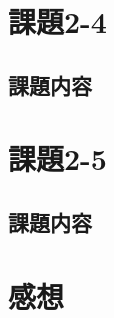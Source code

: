 \documentclass[a4j,11pt]{jarticle}
\begin{document}
\section{課題2-4}
\subsection{課題内容}

\section{課題2-5}

\subsection{課題内容}

\section{感想}
\end{document}
